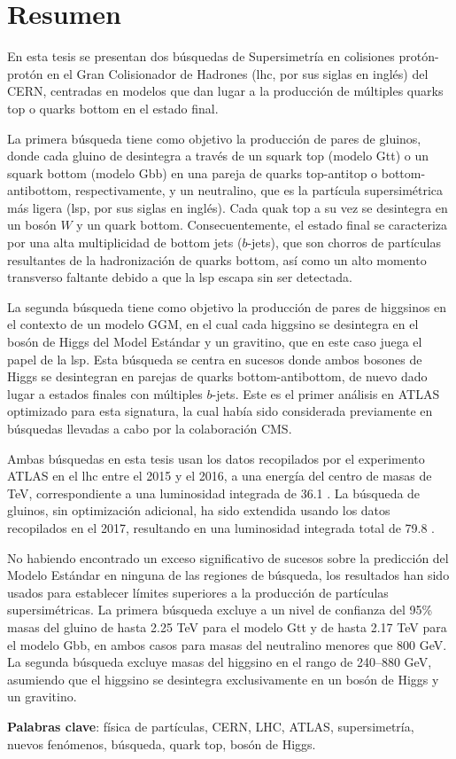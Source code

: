 \chapter*{Resumen}

En esta tesis se presentan dos b\'usquedas de Supersimetr\'ia en colisiones prot\'on-prot\'on en el Gran Colisionador de Hadrones (\gls{lhc}, por sus siglas en ingl\'es) del CERN,
centradas en modelos que dan lugar a la producci\'on de m\'ultiples quarks top o quarks bottom en el estado final.

La primera b\'usqueda tiene como objetivo la producci\'on de pares de gluinos, donde cada gluino de desintegra a trav\'es de un squark top (modelo Gtt) o un squark  
bottom (modelo Gbb) en una pareja de quarks top-antitop o bottom-antibottom, respectivamente, y un neutralino, que es la part\'icula supersim\'etrica m\'as ligera 
(\gls{lsp}, por sus siglas en ingl\'es). Cada quak top a su vez se desintegra en un bos\'on $W$ y un quark bottom.
Consecuentemente, el estado final se caracteriza por una alta multiplicidad de bottom jets ($b$-jets), que son chorros de part\'iculas resultantes de
la hadronizaci\'on de quarks bottom, as\'i como un alto momento transverso faltante  debido a que la \gls{lsp} escapa sin ser detectada. 

La segunda b\'usqueda tiene como objetivo la producci\'on de pares de higgsinos en el contexto de un modelo GGM, en el cual cada higgsino 
se desintegra en el bos\'on de Higgs del Model Est\'andar y un gravitino, que en este caso juega el papel de la \gls{lsp}.
Esta b\'usqueda se centra en sucesos donde ambos bosones de Higgs se desintegran en parejas de quarks bottom-antibottom, de nuevo dado lugar a estados finales 
con m\'ultiples $b$-jets. 
Este es el primer an\'alisis en ATLAS optimizado para esta signatura, la cual hab\'ia sido considerada previamente en b\'usquedas llevadas a cabo por
la colaboraci\'on CMS.

Ambas b\'usquedas en esta tesis usan los datos recopilados por el experimento ATLAS en el \gls{lhc} 
entre el 2015 y el 2016, a una energ\'ia del centro de masas de \cmtre TeV,
correspondiente a una luminosidad integrada de 36.1 \ifb.
La b\'usqueda de gluinos, sin optimizaci\'on adicional, ha sido extendida usando los datos recopilados en el 2017, resultando en una luminosidad integrada total de 79.8 \ifb.

No habiendo encontrado un exceso significativo de sucesos sobre la predicci\'on del Modelo Est\'andar en ninguna de las regiones de b\'usqueda,
los resultados han sido usados para establecer l\'imites superiores a la producci\'on de part\'iculas supersim\'etricas.
La primera b\'usqueda excluye a un nivel de confianza del 95\% masas del gluino de hasta 2.25 TeV para el modelo Gtt
y de hasta 2.17 TeV para el modelo Gbb, en ambos casos para masas del neutralino menores que 800 GeV.
La segunda b\'usqueda excluye masas del higgsino en el rango de 240--880 GeV, asumiendo que 
el higgsino se desintegra exclusivamente en un bos\'on de Higgs y un gravitino.

\par\bigskip
\par\bigskip 
\par\bigskip

\noindent \textbf{Palabras clave}: f\'isica de part\'iculas, CERN, LHC, ATLAS, supersimetr\'ia, nuevos fen\'omenos, b\'usqueda, quark top, bos\'on de Higgs.

